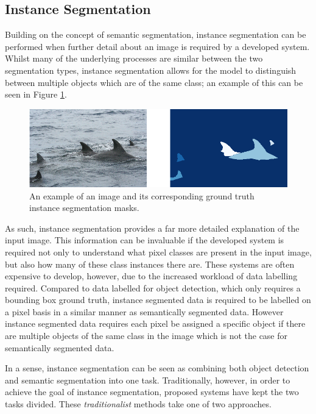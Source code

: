 \subsection{Instance Segmentation}\label{ch:Background,sec:instanceSegmentation}

Building on the concept of semantic segmentation, instance segmentation can be performed when further detail about an image is required by a developed system. Whilst many of the underlying processes are similar between the two segmentation types, instance segmentation allows for the model to distinguish between multiple objects which are of the same class; an example of this can be seen in Figure \ref{fig:masks-example}.

\begin{figure}
	\begin{center}
		\includegraphics[scale=0.5]{Chapter2/figs/masks-example.png}
	\end{center}
	\caption{An example of an image and its corresponding ground truth instance segmentation masks.}
	\label{fig:masks-example}
\end{figure}

As such, instance segmentation provides a far more detailed explanation of the input image. This information can be invaluable if the developed system is required not only to understand what pixel classes are present in the input image, but also how many of these class instances there are. These systems are often expensive to develop, however, due to the increased workload of data labelling required. Compared to data labelled for object detection, which only requires a bounding box ground truth, instance segmented data is required to be labelled on a pixel basis in a similar manner as semantically segmented data. However instance segmented data requires each pixel be assigned a specific object if there are multiple objects of the same class in the image which is not the case for semantically segmented data.

In a sense, instance segmentation can be seen as combining both object detection and semantic segmentation into one task. Traditionally, however, in order to achieve the goal of instance segmentation, proposed systems have kept the two tasks divided. These \textit{traditionalist} methods take one of two approaches. 

